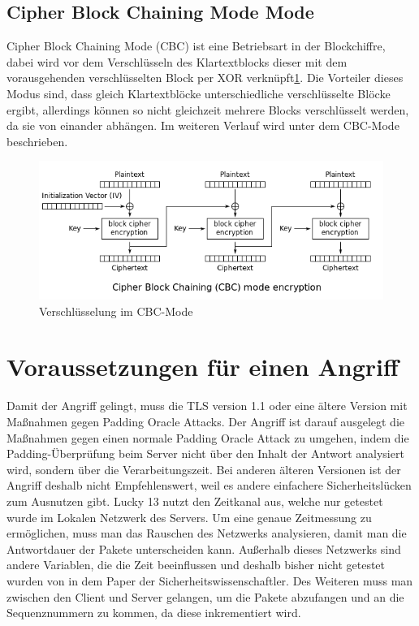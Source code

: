 \documentclass[a4paper,10pt]{scrartcl}
\begin{document}
    \subsection{Cipher Block Chaining Mode Mode}\label{subsec:cbc-mode}
    Cipher Block Chaining Mode (CBC) ist eine Betriebsart in der Blockchiffre, dabei wird vor dem Verschlüsseln des Klartextblocks dieser mit dem vorausgehenden verschlüsselten Block per XOR verknüpft\ref{CBC_Mode}.
    Die Vorteiler dieses Modus sind, dass gleich Klartextblöcke unterschiedliche verschlüsselte Blöcke ergibt, allerdings können so nicht gleichzeit mehrere Blocks verschlüsselt werden, da sie von einander abhängen.
    Im weiteren Verlauf wird unter dem CBC-Mode beschrieben.
    \begin{figure}[h]
        \begin{center}
            \includegraphics[width=12cm]{./Literatur/documents/wo8Bl}\newline\caption{Verschlüsselung im CBC-Mode}
            \label{CBC_Mode}
        \end{center}
    \end{figure}


    \section{Voraussetzungen für einen Angriff}\label{sec:voraussetzungen-fur-einen-angriff}
    Damit der Angriff gelingt, muss die TLS version 1.1 oder eine ältere Version mit Maßnahmen gegen Padding Oracle Attacks.
    Der Angriff ist darauf ausgelegt die Maßnahmen gegen einen normale Padding Oracle Attack zu umgehen, indem die Padding-Überprüfung beim Server nicht über den Inhalt der Antwort analysiert wird, sondern über die Verarbeitungszeit.
    Bei anderen älteren Versionen ist der Angriff deshalb nicht Empfehlenswert, weil es andere einfachere Sicherheitslücken zum Ausnutzen gibt.
    \newline
    Lucky 13 nutzt den Zeitkanal aus, welche nur getestet wurde im Lokalen Netzwerk des Servers.
    Um eine genaue Zeitmessung zu ermöglichen, muss man das Rauschen des Netzwerks analysieren, damit man die Antwortdauer der Pakete unterscheiden kann.
    Außerhalb dieses Netzwerks sind andere Variablen, die die Zeit beeinflussen und deshalb bisher nicht getestet wurden von in dem Paper der Sicherheitswissenschaftler\cite[S. 11]{AlFardan2013}.
    Des Weiteren muss man zwischen den Client und Server gelangen, um die Pakete abzufangen und an die Sequenznummern zu kommen, da diese inkrementiert wird.
\end{document}

